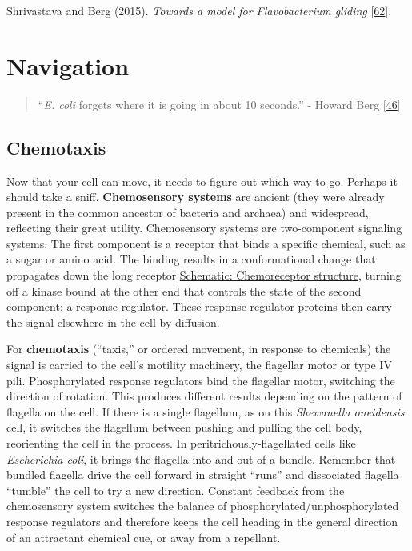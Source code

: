 \documentclass[]{tufte-book}
\begin{document}
Shrivastava and Berg (2015). \emph{Towards a model for Flavobacterium gliding} {[}\protect\hyperlink{ref-shrivastava2015}{62}{]}.

\hypertarget{navigation}{%
\chapter{Navigation}\label{navigation}}

\begin{quote}
``\emph{E. coli} forgets where it is going in about 10 seconds.''
- Howard Berg {[}\protect\hyperlink{ref-berg1988}{46}{]}
\end{quote}

\hypertarget{chemotaxis}{%
\section{Chemotaxis}\label{chemotaxis}}

Now that your cell can move, it needs to figure out which way to go. Perhaps it should take a sniff. \textbf{Chemosensory systems} are ancient (they were already present in the common ancestor of bacteria and archaea) and widespread, reflecting their great utility. Chemosensory systems are two-component signaling systems. The first component is a receptor that binds a specific chemical, such as a sugar or amino acid. The binding results in a conformational change that propagates down the long receptor \protect\hyperlink{Chemoreceptor_structure}{Schematic: Chemoreceptor structure}, turning off a kinase bound at the other end that controls the state of the second component: a response regulator. These response regulator proteins then carry the signal elsewhere in the cell by diffusion.

For \textbf{chemotaxis} (``taxis,'' or ordered movement, in response to chemicals) the signal is carried to the cell's motility machinery, the flagellar motor or type IV pili. Phosphorylated response regulators bind the flagellar motor, switching the direction of rotation. This produces different results depending on the pattern of flagella on the cell. If there is a single flagellum, as on this \emph{Shewanella oneidensis} cell, it switches the flagellum between pushing and pulling the cell body, reorienting the cell in the process. In peritrichously-flagellated cells like \emph{Escherichia coli}, it brings the flagella into and out of a bundle. Remember that bundled flagella drive the cell forward in straight ``runs'' and dissociated flagella ``tumble'' the cell to try a new direction. Constant feedback from the chemosensory system switches the balance of phosphorylated/unphosphorylated response regulators and therefore keeps the cell heading in the general direction of an attractant chemical cue, or away from a repellant.
\end{document}
